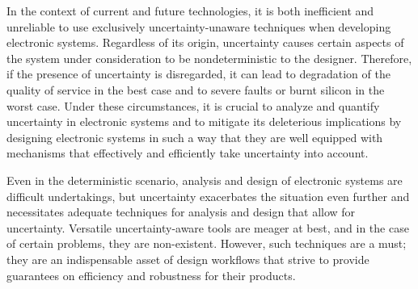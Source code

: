 In the context of current and future technologies, it is both inefficient and
unreliable to use exclusively uncertainty-unaware techniques when developing
electronic systems. Regardless of its origin, uncertainty causes certain aspects
of the system under consideration to be nondeterministic to the designer.
Therefore, if the presence of uncertainty is disregarded, it can lead to
degradation of the quality of service in the best case and to severe faults or
burnt silicon in the worst case. Under these circumstances, it is crucial to
analyze and quantify uncertainty in electronic systems and to mitigate its
deleterious implications by designing electronic systems in such a way that they
are well equipped with mechanisms that effectively and efficiently take
uncertainty into account.

Even in the deterministic scenario, analysis and design of electronic systems
are difficult undertakings, but uncertainty exacerbates the situation even
further and necessitates adequate techniques for analysis and design that allow
for uncertainty. Versatile uncertainty-aware tools are meager at best, and in
the case of certain problems, they are non-existent. However, such techniques
are a must; they are an indispensable asset of design workflows that strive to
provide guarantees on efficiency and robustness for their products.
